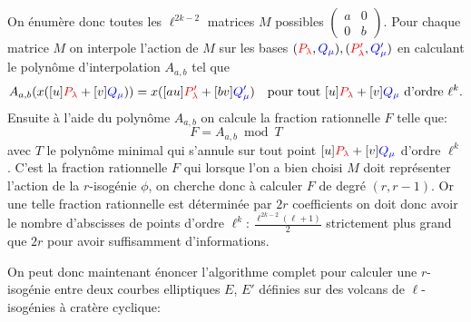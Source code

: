 \documentclass[10pt,a4paper]{book}
\theoremstyle{plain}
\theoremstyle{definition}
\theoremstyle{definition}
\theoremstyle{definition}
\theoremstyle{definition}
\theoremstyle{remark}
\theoremstyle{remark}
\theoremstyle{definition}
\begin{document}
 On énumère donc toutes les $\ell^{2k-2}$ matrices $M$ possibles $\left( 
 \begin{smallmatrix} a & 0 \\ 0 & b \end{smallmatrix} \right)$. Pour chaque 
matrice $M$ on interpole l'action de $M$ sur les bases $(\color{red}P_{\lambda}
 \color{black},\color{blue}Q_{\mu}\color{black}),(\color{red}P'_{\lambda}
\color{black},\color{blue}Q'_{\mu}\color{black})$ en calculant le 
polynôme d'interpolation $A_{a,b}$ tel que 
\[
A_{a,b}(x([u]\color{red}P_{\lambda}
 \color{black}+[v]\color{blue}Q_{\mu}\color{black}))=x([au]\color{red}P'_{\lambda}
 \color{black}+[bv]\color{blue}Q'_{\mu}\color{black}) \quad \text{pour tout $[u]\color{red}P_{\lambda}
 \color{black}+[v]\color{blue}Q_{\mu}\color{black}$ d'ordre $\ell^k$}.
\]
Ensuite à l'aide du polynôme $A_{a,b}$ on calcule la fraction rationnelle $F$ telle que:
\[
F=A_{a,b} \bmod T
\]
avec $T$ le polynôme minimal qui s'annule sur tout point $[u]\color{red}
P_{\lambda} \color{black}+[v]\color{blue}Q_{\mu}\color{black}$ d'ordre 
$\ell^k$. C'est la fraction rationnelle $F$ qui lorsque l'on a bien choisi 
$M$ doit représenter l'action de la $r$-isogénie $\phi$, on cherche donc à 
calculer $F$ de degré $(r,r-1)$. Or une telle fraction rationnelle est 
déterminée par $2r$ coefficients on doit donc avoir
le nombre d'abscisses de points d'ordre $\ell^k$: $\frac{\ell^{2k-2}(\ell+1)}
{2}$ strictement plus grand que $2r$ pour avoir suffisamment d'informations.


On peut donc maintenant énoncer l'algorithme complet pour calculer une 
$r$-isogénie entre deux courbes elliptiques $E$, $E'$ définies sur des volcans 
de $\ell$-isogénies à cratère cyclique: 
\end{document}
